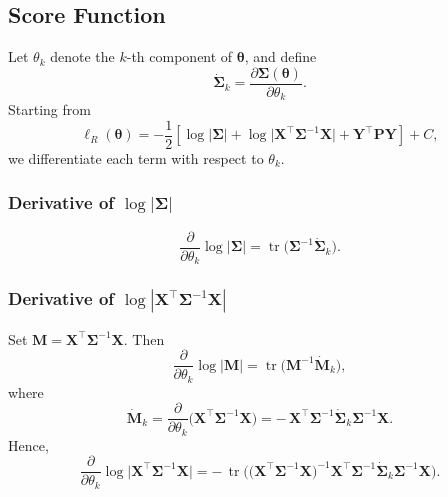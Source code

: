 \documentclass[
  letterpaper,
  DIV=11,
  numbers=noendperiod]{scrartcl}
\begin{document}
\subsection{Score Function}\label{score-function}

Let \(\theta_k\) denote the \(k\)-th component of \(\symbf{\theta}\),
and define \begin{equation}
\dot{\symbf{\Sigma}}_k
=
\frac{\partial \symbf{\Sigma}(\symbf{\theta})}{\partial \theta_k}.
\end{equation} Starting from \begin{equation}
\ell_R(\symbf{\theta})
=
-\frac{1}{2}\left[
\log|\symbf{\Sigma}|
+ \log\big|\symbf{X}^\top \symbf{\Sigma}^{-1}\symbf{X}\big|
+ \symbf{Y}^\top \symbf{P}\symbf{Y}
\right]
+ C,
\end{equation} we differentiate each term with respect to \(\theta_k\).

\subsubsection*{Derivative of $\log|\symbf{\Sigma}|$}

\begin{equation}
\frac{\partial}{\partial \theta_k}\log|\symbf{\Sigma}|
=
\operatorname{tr}\!\big(\symbf{\Sigma}^{-1}\dot{\symbf{\Sigma}}_k\big).
\end{equation}

\subsubsection*{Derivative of $\log|\symbf{X}^\top \symbf{\Sigma}^{-1}\symbf{X}|$}

Set \(\symbf{M} = \symbf{X}^\top \symbf{\Sigma}^{-1}\symbf{X}\). Then
\begin{equation}
\frac{\partial}{\partial \theta_k}\log|\symbf{M}|
=
\operatorname{tr}\!\big(\symbf{M}^{-1} \dot{\symbf{M}}_k\big),
\end{equation} where \begin{equation}
\dot{\symbf{M}}_k
=
\frac{\partial}{\partial \theta_k}
\big(\symbf{X}^\top \symbf{\Sigma}^{-1}\symbf{X}\big)
=
-\,\symbf{X}^\top \symbf{\Sigma}^{-1}
\dot{\symbf{\Sigma}}_k
\symbf{\Sigma}^{-1}\symbf{X}.
\end{equation} Hence, \begin{equation}
\frac{\partial}{\partial \theta_k}
\log\big|\symbf{X}^\top \symbf{\Sigma}^{-1}\symbf{X}\big|
=
-\,\operatorname{tr}\!\Big(
\big(\symbf{X}^\top \symbf{\Sigma}^{-1}\symbf{X}\big)^{-1}
\symbf{X}^\top \symbf{\Sigma}^{-1}
\dot{\symbf{\Sigma}}_k
\symbf{\Sigma}^{-1}\symbf{X}
\Big).
\end{equation}
\end{document}
